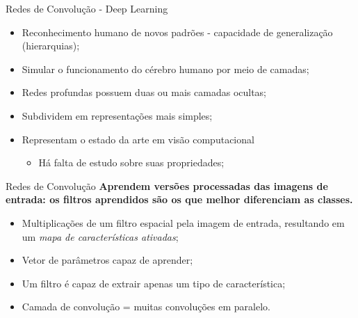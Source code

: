 \documentclass{beamer}
\begin{document}
\begin{frame}{Redes de Convolução - Deep Learning}
\setlength\leftmargini{0em}
\justifying 
\begin{itemize}
  \item Reconhecimento humano de novos padrões - capacidade de generalização (hierarquias);%
  \item Simular o funcionamento do cérebro humano por meio de camadas;
  \item Redes profundas possuem duas ou mais camadas ocultas; 
  \item Subdividem em representações mais simples;
  \item Representam o estado da arte em visão computacional
  \begin{itemize}
    \item Há falta de estudo sobre suas propriedades;
  \end{itemize}
\end{itemize}
\end{frame}
\begin{frame}{Redes de Convolução}
\setlength\leftmargini{0em}
\justifying
\textbf{Aprendem versões processadas das imagens de entrada: os filtros aprendidos são os que melhor diferenciam as classes.}
\vspace{1cm}
\begin{itemize}
  \item Multiplicações de um filtro espacial pela imagem de entrada, resultando em um \emph{mapa de características ativadas}; 
  \item Vetor de parâmetros capaz de aprender;
  \item Um filtro é capaz de extrair apenas um tipo de característica;
  \item Camada de convolução = muitas convoluções em paralelo.
\end{itemize}
\end{frame}
\end{document}
